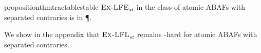 \documentclass[letterpaper]{article} %
\newcommand{\stb}{\textit{st}}
\newcommand{\asms}{\asm}
\newcommand{\theory}{\mathit{Th}}
\newcommand{\asm}{\ensuremath{\mathcal{A}}}
\newcommand{\atoms}{\mathcal{L}}
\newcommand{\ruleset}{\mathcal{R}}
\newcommand{\assumptions}{\mathcal{A}}
\newcommand{\contra}{c}
\newcommand{\contrary}[1]{c(#1)}
\newcommand{\ABAdef}{D=(\atoms,\ruleset,\assumptions,\contra)}
\newcommand{\setS}{\mathbb{S}}
\newcommand{\contraryAF}[1]{F^{c}_{#1}}
\newcommand{\contraryArgs}[1]{\asm^{c}_{#1}}
\newcommand{\ExLFE}[2]{\textsc{Ex-LFE}_{#1}^{#2}}
\newcommand{\ExLFL}[2]{\textsc{Ex-LFL}_{#1}^{#2}}
\newcommand{\Xpos}{\mathcal{X}^{pos}}
\newcommand{\Xneg}{\mathcal{X}^{neg}}
\begin{document}
\begin{restatable}{proposition}{thmtractablestable}\label{thm:tractable-stable} 
%
    $\ExLFE{\stb}{}$ in the class of atomic ABAFs with separated contraries is in \P.
\end{restatable}
%
We show in the appendix that $\ExLFL{\stb}{}$ remains \NP-hard for atomic ABAFs with separated contraries.


\end{document}
